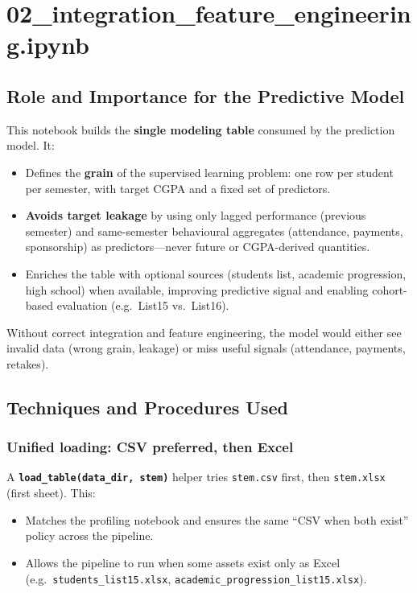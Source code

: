 \documentclass[12pt,a4paper]{article}
\begin{document}
\section{02\_integration\_feature\_engineering.ipynb}

\subsection{Role and Importance for the Predictive Model}

This notebook builds the \textbf{single modeling table} consumed by the prediction model. It:

\begin{itemize}[leftmargin=*]
  \item Defines the \textbf{grain} of the supervised learning problem: one row per student per semester, with target CGPA and a fixed set of predictors.
  \item \textbf{Avoids target leakage} by using only lagged performance (previous semester) and same-semester behavioural aggregates (attendance, payments, sponsorship) as predictors---never future or CGPA-derived quantities.
  \item Enriches the table with optional sources (students list, academic progression, high school) when available, improving predictive signal and enabling cohort-based evaluation (e.g.\ List15 vs.\ List16).
\end{itemize}

Without correct integration and feature engineering, the model would either see invalid data (wrong grain, leakage) or miss useful signals (attendance, payments, retakes).

\subsection{Techniques and Procedures Used}

\subsubsection{Unified loading: CSV preferred, then Excel}

A \textbf{\texttt{load\_table(data\_dir, stem)}} helper tries \texttt{stem.csv} first, then \texttt{stem.xlsx} (first sheet). This:

\begin{itemize}[leftmargin=*]
  \item Matches the profiling notebook and ensures the same ``CSV when both exist'' policy across the pipeline.
  \item Allows the pipeline to run when some assets exist only as Excel (e.g.\ \texttt{students\_list15.xlsx}, \texttt{academic\_progression\_list15.xlsx}).
\end{itemize}
\end{document}
